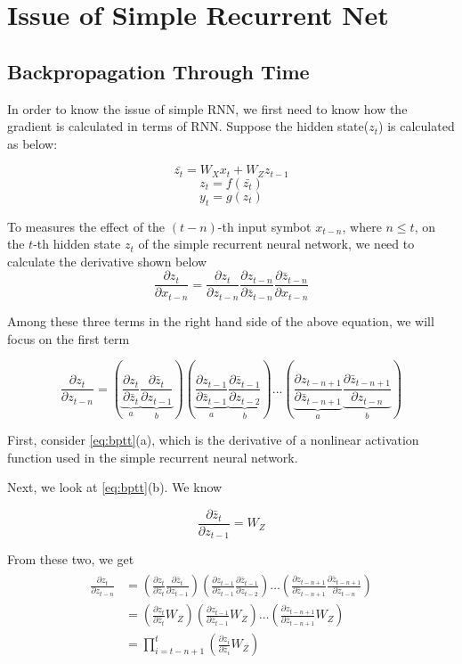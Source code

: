 \section{Issue of Simple Recurrent Net}
\subsection{Backpropagation Through Time}
In order to know the issue of simple RNN, we first need to know how the gradient is calculated in terms of RNN. Suppose the hidden state($z_t$) is calculated as below:

\[\bar{z_t} = W_X x_t + W_Z z_{t-1}\]
\[z_t = f(\bar{z_t})\]
\[y_t = g(z_t)\]

To measures the effect of the $(t-n)$-th input symbot $x_{t-n}$, where $n\leq{t}$, on the $t$-th hidden state $z_t$ of the simple recurrent neural network, we need to calculate the derivative shown below
\[\frac{\partial z_t}{\partial x_{t-n}}=\frac{\partial z_t}{\partial z_{t-n}}\frac{\partial z_{t-n}}{\partial \bar{z}_{t-n}}\frac{\partial \bar{z}_{t-n}}{\partial x_{t-n}}\]

Among these three terms in the right hand side of the above equation, we will focus on the first term

\begin{equation} \label{eq:bptt}
\frac{\partial z_t}{\partial z_{t-n}} = (\underbrace{\frac{\partial z_t}{\partial \bar{z}_{t}}}_{a}\underbrace{\frac{\partial \bar{z}_{t}}{\partial z_{t-1}}}_{b})
(\underbrace{\frac{\partial z_{t-1}}{\partial \bar{z}_{t-1}}}_{a}\underbrace{\frac{\partial \bar{z}_{t-1}}{\partial z_{t-2}}}_{b}) \ldots 
(\underbrace{\frac{\partial z_{t-n+1}}{\partial \bar{z}_{t-n+1}}}_{a}\underbrace{\frac{\partial \bar{z}_{t-n+1}}{\partial z_{t-n}}}_{b})
\end{equation}

First, consider \cref{eq:bptt}(a), which is the derivative of a nonlinear activation function used in the simple recurrent neural network.

Next, we look at \cref{eq:bptt}(b). We know

\[\frac{\partial \bar{z}_{t}}{\partial z_{t-1}} = W_Z\]

From these two, we get
\begin{align} \label{eq:bptt_result}
\begin{split}
\frac{\partial z_t}{\partial z_{t-n}} &= (\frac{\partial z_t}{\partial \bar{z}_{t}}\frac{\partial \bar{z}_{t}}{\partial z_{t-1}})
(\frac{\partial z_{t-1}}{\partial \bar{z}_{t-1}}\frac{\partial \bar{z}_{t-1}}{\partial z_{t-2}}) \ldots 
(\frac{\partial z_{t-n+1}}{\partial \bar{z}_{t-n+1}}\frac{\partial \bar{z}_{t-n+1}}{\partial z_{t-n}}) \\
&= (\frac{\partial z_t}{\partial \bar{z}_{t}}W_Z)
(\frac{\partial z_{t-1}}{\partial \bar{z}_{t-1}}W_Z) \ldots 
(\frac{\partial z_{t-n+1}}{\partial \bar{z}_{t-n+1}}W_Z) \\
&= \prod\limits_{i=t-n+1}^{t} (\frac{\partial z_i}{\partial \bar{z}_{i}}W_Z)
\end{split}
\end{align}

